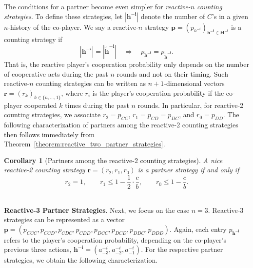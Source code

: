 \documentclass[9pt,twoside,lineno]{pnas-new}
\theoremstyle{plainCl1}
\newtheorem{corollary}{Corollary}
\theoremstyle{plainCl2}
\begin{document}
The conditions for a partner become even simpler for {\it reactive-$n$ counting strategies}. To define these strategies, let $|\mathbf{h^{-i}}|$ denote the number of $C$'s in a given $n$-history of the co-player. We say a reactive-$n$ strategy $\mathbf{p}\!=\!(p_{h^{-i}})_{\mathbf{h^{-i}\in H^{-i}}}$ is a counting strategy if 
\begin{equation}
|\mathbf{h}^{-i}|\! =\! |\mathbf{\tilde h^{-i}}| \quad \Rightarrow \quad p_\mathbf{h^{-i}} = p_\mathbf{\tilde h^{-i}}. 
\end{equation} 
That is, the reactive player's cooperation probability only depends on the number of cooperative acts during the past $n$ rounds and not on their timing. 
Such reactive-$n$ counting strategies can be written as $n\!+\!1$-dimensional vectors $\mathbf{r}\!=\!(r_k)_{k\in\{n,\ldots,1\}}$, where $r_i$ is the player's cooperation probability if the co-player cooperated $k$ times during the past $n$ rounds. In particular, for reactive-2 counting strategies, we associate $r_2\!=\!p_{CC}$, $r_1\!=\!p_{CD}\!=\!p_{DC}$, and $r_0\!=\!p_{DD}$. 
The following characterization of partners among the reactive-2 counting strategies then follows immediately from Theorem~\ref{theorem:reactive_two_partner_strategies}. 

\begin{corollary}[Partners among the reactive-2 counting strategies]
\label{Cor:PartnersCountingTwo} 
A nice reactive-2 counting strategy $\mathbf{r} = (r_2, r_1, r_0)$ is a partner strategy if and only if
\begin{equation}\label{eq:counting_two_bit_conditions}
 r_2 \!=\! 1, \qquad r_1 \!\le\! 1\!-\!\frac{1}{2} \cdot \frac{c}{b}, \qquad r_0 \!\le\! 1\!-\! \frac{c}{b}.
\end{equation}
\end{corollary}
 ~\\


\noindent
{\bf Reactive-3 Partner Strategies}.
Next, we focus on the case $n\!=\!3$. Reactive-3 strategies can be represented as a vector 
$\mathbf{p}=(p_{CCC}, p_{CCD}, p_{CDC}, p_{CDD}, p_{DCC}, p_{DCD}, p_{DDC}, p_{DDD})$.
Again, each entry $p_\mathbf{h^{-i}}$ refers to the player's cooperation probability, depending on the co-player's previous three actions, $\mathbf{h^{-i}}\!=\!(a^{-i}_{-3}, a^{-i}_{-2}, a^{-i}_{-1})$.
For the respective partner strategies, we obtain the following characterization. 
\end{document}
